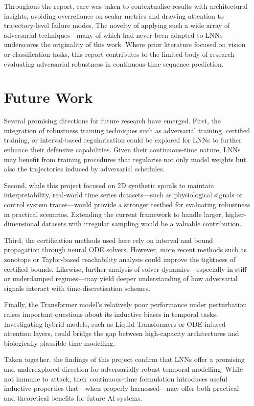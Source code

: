 Throughout the report, care was taken to contextualise results with architectural insights, avoiding overreliance on scalar metrics and drawing attention to trajectory-level failure modes. The novelty of applying such a wide array of adversarial techniques—many of which had never been adapted to LNNs—underscores the originality of this work. Where prior literature focused on vision or classification tasks, this report contributes to the limited body of research evaluating adversarial robustness in continuous-time sequence prediction.

\section{Future Work}

Several promising directions for future research have emerged. First, the integration of robustness training techniques such as adversarial training, certified training, or interval-based regularisation could be explored for LNNs to further enhance their defensive capabilities. Given their continuous-time nature, LNNs may benefit from training procedures that regularise not only model weights but also the trajectories induced by adversarial schedules.

Second, while this project focused on 2D synthetic spirals to maintain interpretability, real-world time series datasets—such as physiological signals or control system traces—would provide a stronger testbed for evaluating robustness in practical scenarios. Extending the current framework to handle larger, higher-dimensional datasets with irregular sampling would be a valuable contribution.

Third, the certification methods used here rely on interval and bound propagation through neural ODE solvers. However, more recent methods such as zonotope or Taylor-based reachability analysis could improve the tightness of certified bounds. Likewise, further analysis of solver dynamics—especially in stiff or underdamped regimes—may yield deeper understanding of how adversarial signals interact with time-discretisation schemes.

Finally, the Transformer model's relatively poor performance under perturbation raises important questions about its inductive biases in temporal tasks. Investigating hybrid models, such as Liquid Transformers or ODE-infused attention layers, could bridge the gap between high-capacity architectures and biologically plausible time modelling.

Taken together, the findings of this project confirm that LNNs offer a promising and underexplored direction for adversarially robust temporal modelling. While not immune to attack, their continuous-time formulation introduces useful inductive properties that—when properly harnessed—may offer both practical and theoretical benefits for future AI systems.